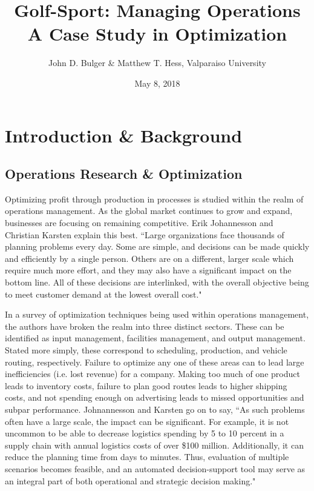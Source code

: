 \documentclass{article}
\title{Golf-Sport:  Managing Operations \\ A Case Study in Optimization}
\date{May 8, 2018}
\author{John D. Bulger \& Matthew T. Hess, Valparaiso University}
\begin{document}
	\maketitle
	\newpage
\section{Introduction \& Background}
\subsection{Operations Research \& Optimization}
Optimizing profit through production in processes is studied within the realm of operations management. As the global market continues to grow and expand, businesses are focusing on remaining competitive. Erik Johannesson and Christian Karsten explain this best. ``Large organizations face thousands of planning problems every day. Some are simple, and decisions can be made quickly and efficiently by a single person. Others are on a different, larger scale which require much more effort, and they may also have a significant impact on the bottom line.  All of these decisions are interlinked, with the overall objective being to meet customer demand at the lowest overall cost."\cite{johan}
\par
In a survey of optimization techniques being used within operations management, the authors have broken the realm into three distinct sectors. These can be identified as input management, facilities management, and output management. Stated more simply, these correspond to scheduling, production, and vehicle routing, respectively. Failure to optimize any one of these areas can to lead large inefficiencies (i.e. lost revenue) for a company. Making too much of one product leads to inventory costs, failure to plan good routes leads to higher shipping costs, and not spending enough on advertising leads to missed opportunities and subpar performance. Johnannesson and Karsten go on to say, ``As such problems often have a large scale, the impact can be significant. For example, it is not uncommon to be able to decrease logistics spending by 5 to 10 percent in a supply chain with annual logistics costs of over \$100 million. 
Additionally, it can reduce the planning time from days to minutes. Thus, evaluation of multiple scenarios becomes feasible, and an automated decision-support tool may serve as an integral part of both operational and strategic decision making."\cite{johan}  
\end{document}

